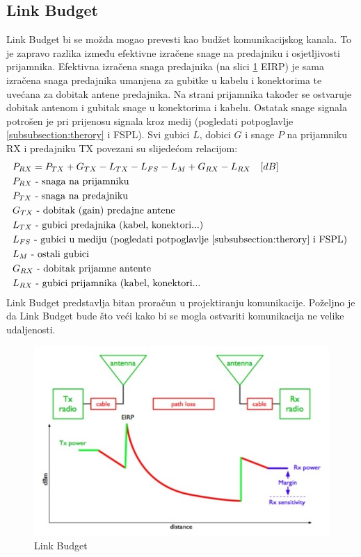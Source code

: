 \subsection{Link Budget}
\label{subsection:link_budget}
Link Budget bi se možda mogao prevesti kao budžet komunikacijskog kanala. To je zapravo razlika između efektivne izračene snage na predajniku i osjetljivosti prijamnika. Efektivna izračena snaga predajnika (na slici \ref{img:link_bduget} EIRP) je sama izračena snaga predajnika umanjena za gubitke u kabelu i konektorima te uvećana za dobitak antene predajnika. Na strani prijamnika također se ostvaruje dobitak antenom i gubitak snage u konektorima i kabelu. Ostatak snage signala potrošen je pri prijenosu signala kroz medij (pogledati potpoglavlje \ref{subsubsection:therory} i FSPL). Svi gubici $L$, dobici $G$ i snage $P$ na prijamniku RX i predajniku TX povezani su slijedećom relacijom:
\begin{equation}
\begin{aligned}
&P_{RX} = P_{TX} + G_{TX} - L_{TX} - L_{FS} - L_{M} + G_{RX} - L_{RX} \quad[dB] \\
&P_{RX} \text{ - snaga na prijamniku}\\
&P_{TX} \text{ - snaga na predajniku}\\
&G_{TX} \text{ - dobitak (gain) predajne antene}\\
&L_{TX} \text{ - gubici predajnika (kabel, konektori...)}\\
&L_{FS} \text{ - gubici u mediju (pogledati potpoglavlje \ref{subsubsection:therory} i FSPL) }\\
&L_{M} \text{ - ostali gubici}\\
&G_{RX} \text{ - dobitak prijamne antente}\\
&L_{RX} \text{ - gubici prijamnika (kabel, konektori...}\\
\end{aligned}
\end{equation}
Link Budget predstavlja bitan proračun u projektiranju komunikacije. Poželjno je da Link Budget bude što veći kako bi se mogla ostvariti komunikacija ne velike udaljenosti.  
\begin{figure}[ht!]
	\centering
	\includegraphics[width=1.0\textwidth]{images/link_budget.jpg}
	\caption{Link Budget}
	\label{img:link_bduget}
\end{figure}
\newpage

